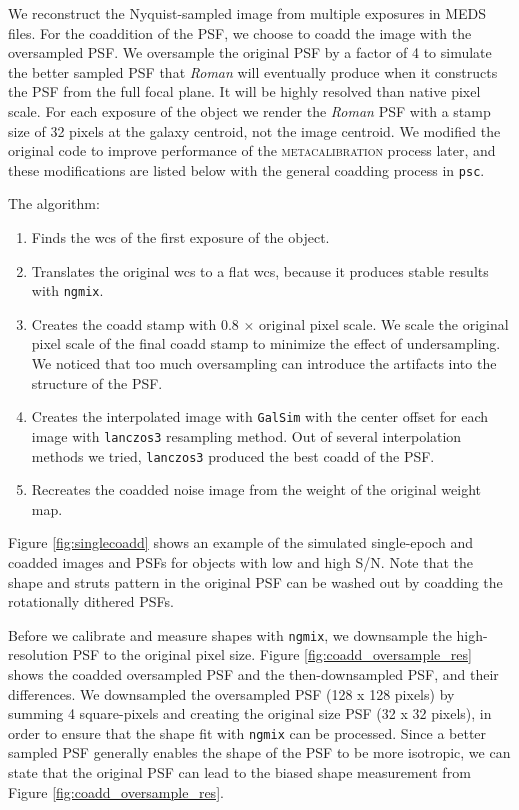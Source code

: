 \documentclass[fleqn,usenatbib]{mnras}
\begin{document}
We reconstruct the Nyquist-sampled image from multiple exposures in MEDS files. For the coaddition of the PSF, we choose to coadd the image with the oversampled PSF. We oversample the original PSF by a factor of 4 to simulate the better sampled PSF that \emph{Roman} will eventually produce when it constructs the PSF from the full focal plane. It will be highly resolved than native pixel scale. For each exposure of the object we render the \emph{Roman} PSF with a stamp size of 32 pixels at the galaxy centroid, not the image centroid. We modified the original code to improve performance of the \textsc{metacalibration} process later, and these modifications are listed below with the general coadding process in \texttt{psc}. 

The algorithm: 
\begin{enumerate}
    \setlength\itemsep{1em}
    \item Finds the wcs of the first exposure of the object.
    \item Translates the original wcs to a flat wcs, because it produces stable results with \texttt{ngmix}.
    \item Creates the coadd stamp with 0.8 $\times$ original pixel scale. We scale the original pixel scale of the final coadd stamp to minimize the effect of undersampling. We noticed that too much oversampling can introduce the artifacts into the structure of the PSF. 
    \item Creates the interpolated image with \texttt{GalSim} with the center offset for each image with \texttt{lanczos3} resampling method. Out of several interpolation methods we tried, \texttt{lanczos3} produced the best coadd of the PSF.
    \item Recreates the coadded noise image from the weight of the original weight map.
\end{enumerate}


Figure \ref{fig:singlecoadd} shows an example of the simulated single-epoch and coadded images and PSFs for objects with low and high S/N. Note that the shape and struts pattern in the original PSF can be washed out by coadding the rotationally dithered PSFs. 


Before we calibrate and measure shapes with \texttt{ngmix}, we downsample the high-resolution PSF to the original pixel size. Figure \ref{fig:coadd_oversample_res} shows the coadded oversampled PSF and the then-downsampled PSF, and their differences. We downsampled the oversampled PSF (128 x 128 pixels) by summing 4 square-pixels and creating the original size PSF (32 x 32 pixels), in order to ensure that the shape fit with \texttt{ngmix} can be processed. Since a better sampled PSF generally enables the shape of the PSF to be more isotropic, we can state that the original PSF can lead to the biased shape measurement from Figure \ref{fig:coadd_oversample_res}. 
\end{document}
